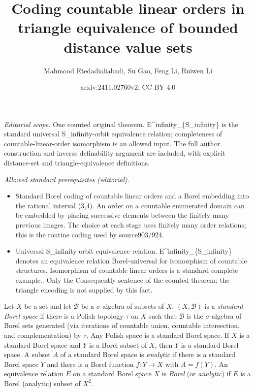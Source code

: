 \documentclass[10pt,a4paper]{amsart}
\title{Coding countable linear orders in triangle equivalence of bounded distance value sets}
\author{Mahmood Etedadialiabadi, Su Gao, Feng Li, Ruiwen Li}
\date{arxiv:2411.02760v2; CC BY 4.0}
\theoremstyle{definition}
\theoremstyle{remark}
\begin{document}
\maketitle
\noindent\textit{Editorial scope.} One counted original theorem. E\textasciicircum{}infinity\_\{S\_infinity\} is the standard universal S\_infinity-orbit equivalence relation; completeness of countable-linear-order isomorphism is an allowed input. The full author construction and inverse definability argument are included, with explicit distance-set and triangle-equivalence definitions.\par\medskip
\noindent\textit{Allowed standard prerequisites (editorial).}\begin{itemize}
\item Standard Borel coding of countable linear orders and a Borel embedding into the rational interval (3,4). An order on a countable enumerated domain can be embedded by placing successive elements between the finitely many previous images. The choice at each stage uses finitely many order relations; this is the routine coding used by source903/924.
\item Universal S\_infinity orbit equivalence relation. E\textasciicircum{}infinity\_\{S\_infinity\} denotes an equivalence relation Borel-universal for isomorphism of countable structures. Isomorphism of countable linear orders is a standard complete example.. Only the Consequently sentence of the counted theorem; the triangle encoding is not supplied by this fact.
\end{itemize}\medskip
Let $X$ be a set and let $\mathcal{B}$ be a $\sigma$-algebra of subsets of $X$. $(X, \mathcal{B})$ is a {\em standard Borel space} if there is a Polish topology $\tau$ on $X$ such that $\mathcal{B}$ is the $\sigma$-algebra of Borel sets generated (via iterations of countable union, countable intersection, and complementation) by $\tau$. Any Polish space is a standard Borel space. If $X$ is a standard Borel space and $Y$ is a Borel subset of $X$, then $Y$ is a standard Borel space. A subset $A$ of a standard Borel space is {\em analytic} if there is a standard Borel space $Y$ and there is a Borel function $f\colon Y\to X$ with $A=f(Y)$. An equivalence relation $E$ on a standard Borel space $X$ is {\em Borel} (or {\em analytic}) if $E$ is a Borel (analytic) subset of $X^2$. 
\end{document}
